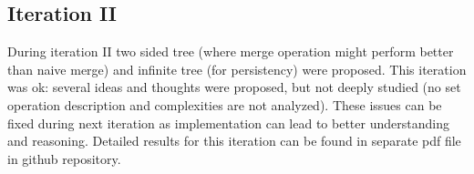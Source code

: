\subsection{Iteration II}
During iteration II two sided tree (where merge operation might perform better than naive merge) and infinite tree (for persistency) were proposed. This iteration was ok: several ideas and thoughts were proposed, but not deeply studied (no set operation description and complexities are not analyzed). These issues can be fixed during next iteration as implementation can lead to better understanding and reasoning. Detailed results for this iteration can be found in separate pdf file\cite{khazhix2} in github repository.